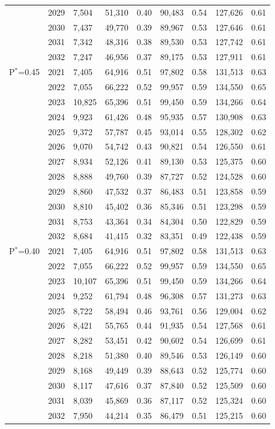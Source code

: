 \documentclass[11pt,
  english,
  a4paper,
]{article}
\begin{document}
\begin{longtable}{lll|ll|ll|ll}
&  2029 & 7,504 & 51,310 & 0.40 & 90,483 & 0.54 & 127,626 & 0.61 \\ 
&  2030 & 7,437 & 49,770 & 0.39 & 89,967 & 0.53 & 127,646 & 0.61 \\ 
&  2031 & 7,342 & 48,316 & 0.38 & 89,530 & 0.53 & 127,742 & 0.61 \\ 
&  2032 & 7,247 & 46,956 & 0.37 & 89,175 & 0.53 & 127,911 & 0.61 \\ 
\hline
P$^*$=0.45
& 2021 & 7,405 & 64,916 & 0.51 & 97,802 & 0.58 & 131,513 & 0.63 \\ 
& 2022 & 7,055 & 66,222 & 0.52 & 99,957 & 0.59 & 134,550 & 0.65 \\ 
& 2023 & 10,825 & 65,396 & 0.51 & 99,450 & 0.59 & 134,266 & 0.64 \\ 
& 2024 & 9,923 & 61,426 & 0.48 & 95,935 & 0.57 & 130,908 & 0.63 \\ 
& 2025 & 9,372 & 57,787 & 0.45 & 93,014 & 0.55 & 128,302 & 0.62 \\ 
&  2026 & 9,070 & 54,742 & 0.43 & 90,821 & 0.54 & 126,550 & 0.61 \\ 
& 2027 & 8,934 & 52,126 & 0.41 & 89,130 & 0.53 & 125,375 & 0.60 \\ 
&  2028 & 8,888 & 49,760 & 0.39 & 87,727 & 0.52 & 124,528 & 0.60 \\ 
& 2029 & 8,860 & 47,532 & 0.37 & 86,483 & 0.51 & 123,858 & 0.59 \\ 
& 2030 & 8,810 & 45,402 & 0.36 & 85,346 & 0.51 & 123,298 & 0.59 \\ 
&  2031 & 8,753 & 43,364 & 0.34 & 84,304 & 0.50 & 122,829 & 0.59 \\ 
& 2032 & 8,684 & 41,415 & 0.32 & 83,351 & 0.49 & 122,438 & 0.59 \\ 
\hline
P$^*$=0.40
&  2021 & 7,405 & 64,916 & 0.51 & 97,802 & 0.58 & 131,513 & 0.63 \\ 
&  2022 & 7,055 & 66,222 & 0.52 & 99,957 & 0.59 & 134,550 & 0.65 \\ 
& 2023 & 10,107 & 65,396 & 0.51 & 99,450 & 0.59 & 134,266 & 0.64 \\ 
&  2024 & 9,252 & 61,794 & 0.48 & 96,308 & 0.57 & 131,273 & 0.63 \\ 
&  2025 & 8,722 & 58,494 & 0.46 & 93,761 & 0.56 & 129,004 & 0.62 \\ 
& 2026 & 8,421 & 55,765 & 0.44 & 91,935 & 0.54 & 127,568 & 0.61 \\ 
& 2027 & 8,282 & 53,451 & 0.42 & 90,602 & 0.54 & 126,699 & 0.61 \\ 
& 2028 & 8,218 & 51,380 & 0.40 & 89,546 & 0.53 & 126,149 & 0.60 \\
& 2029 & 8,168 & 49,449 & 0.39 & 88,643 & 0.52 & 125,774 & 0.60 \\ 
& 2030 & 8,117 & 47,616 & 0.37 & 87,840 & 0.52 & 125,509 & 0.60 \\ 
& 2031 & 8,039 & 45,869 & 0.36 & 87,117 & 0.52 & 125,324 & 0.60 \\ 
& 2032 & 7,950 & 44,214 & 0.35 & 86,479 & 0.51 & 125,215 & 0.60 \\
   \hline
\end{longtable}
\leavevmode\tagmcend\tagstructend\par
\endgroup{}
\endgroup{}
\end{document}
